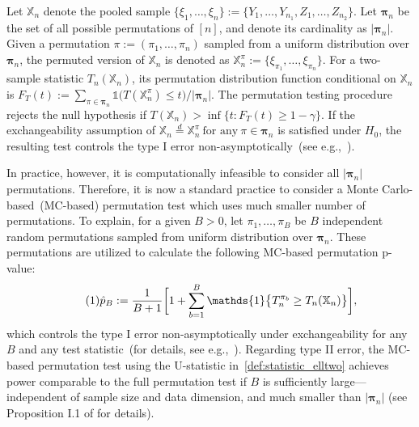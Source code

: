 \documentclass[twoside,11pt]{article}
\newcommand\numberthis{\addtocounter{equation}{1}\tag{\theequation}}
\newcommand{\sampleSize}{n}
\newcommand{\sizeMonteCarlo}{B}
\newcommand{\permutation}{\pi}
\newcommand{\pValueMonteCarlo}{\hat{p}_{\sizeMonteCarlo}}
\begin{document}
Let $\mathbb{X}_n$ denote the pooled sample
$\{\xi_1,\ldots,\xi_n\} := \{Y_1,\ldots,Y_{\sampleSize_1},Z_{1},\ldots,Z_{\sampleSize_2}\}$.
Let $\boldsymbol{\pi}_n$ be the set of all possible permutations of $[\sampleSize]$,
and denote its cardinality as $|\boldsymbol{\pi}_\sampleSize|$.
Given a permutation $\permutation := (\permutation_1, \ldots, \permutation_n)$ sampled from a uniform distribution over $\boldsymbol{\pi}_n$, the permuted version of $\mathbb{X}_n$ is denoted  as $\mathbb{X}_n^\permutation := \{ \xi_{\permutation_1},\ldots,\xi_{\permutation_n} \}$.
For a two-sample statistic $T_\sampleSize(\mathbb{X}_n)$,
its permutation distribution function conditional on $\mathbb{X}_n$ is $F_{T}(t):=
\sum_{\permutation \in \boldsymbol{\pi}_n}
\mathds{1}\bigl(
T(\mathbb{X}_n^\permutation) \leq t
\bigr) / |\boldsymbol{\pi}_\sampleSize|$.
The permutation testing procedure rejects the null hypothesis if $T(\mathbb{X}_n) >  \inf \{t:F_{T}(t) \geq 1 - \gamma\}$.
If the exchangeability assumption of $
\mathbb{X}_n \stackrel{d}{=} \mathbb{X}_n^\permutation~\text{for any}~\permutation \in \boldsymbol{\pi}_\sampleSize$ is satisfied under $H_0$,
the resulting test controls the type I error non-asymptotically~(see e.g.,~\citep{ramdas2023permutation}).

In practice, however, it is computationally infeasible to consider all $|\boldsymbol{\pi}_\sampleSize|$ permutations. Therefore, it is now a standard practice to consider a Monte Carlo-based~(MC-based) permutation test which uses much smaller number of permutations. To explain, for a given $\sizeMonteCarlo >0$, let $\permutation_1, \ldots, \permutation_\sizeMonteCarlo$ be $\sizeMonteCarlo$ independent random permutations sampled from uniform distribution over $\boldsymbol{\pi}_n$.
These permutations are utilized to calculate the following MC-based permutation p-value:
\begin{align*}\numberthis \label{eq:monte_carlo_perm_p_value}
	\pValueMonteCarlo:=\frac{1}{\sizeMonteCarlo+1}
	\biggl[
	1 + \sum_{b=1}^{\sizeMonteCarlo}
	\mathds{1} \bigl\{ T_{\sampleSize}^{\permutation_b} \geq T_{\sampleSize}(\mathbb{X}_{\sampleSize})
	\bigr\}
	\biggr],
\end{align*}
which controls the type I error non-asymptotically under exchangeability for any $B$ and any test statistic~(for details, see e.g.,~\cite{hemerik_exact_2018,ramdas2023permutation}).
Regarding type II error, the MC-based permutation test using the U-statistic in~\eqref{def:statistic_elltwo} achieves power comparable to the full permutation test if $\sizeMonteCarlo$ is sufficiently large—independent of sample size and data dimension, and much smaller than $|\boldsymbol{\pi}_\sampleSize|$ (see Proposition I.1 of \citet{kim_minimax_2022} for details).
\end{document}
